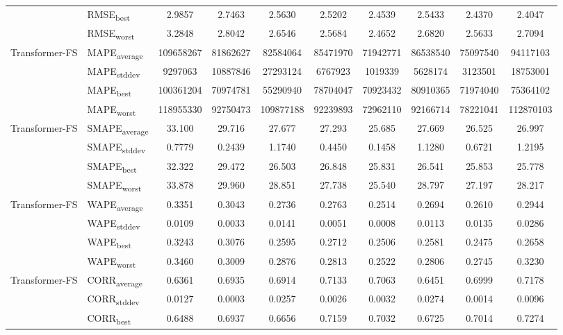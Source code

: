 {\begin{longtable}{l l c c c c c c c c}
 & RMSE\textsubscript{best} & 2.9857 & 2.7463 & 2.5630 & 2.5202 & 2.4539 & 2.5433 & 2.4370 & 2.4047 \\
 & RMSE\textsubscript{worst} & 3.2848 & 2.8042 & 2.6546 & 2.5684 & 2.4652 & 2.6820 & 2.5633 & 2.7094 \\
\cmidrule(lr){2-10}
\multirow{4}{*}{Transformer-FS} & MAPE\textsubscript{average} & 109658267 & 81862627 & 82584064 & 85471970 & 71942771 & 86538540 & 75097540 & 94117103 \\
 & MAPE\textsubscript{stddev} & 9297063 & 10887846 & 27293124 & 6767923 & 1019339 & 5628174 & 3123501 & 18753001 \\
 & MAPE\textsubscript{best} & 100361204 & 70974781 & 55290940 & 78704047 & 70923432 & 80910365 & 71974040 & 75364102 \\
 & MAPE\textsubscript{worst} & 118955330 & 92750473 & 109877188 & 92239893 & 72962110 & 92166714 & 78221041 & 112870103 \\
\cmidrule(lr){2-10}
\multirow{4}{*}{Transformer-FS} & SMAPE\textsubscript{average} & 33.100 & 29.716 & 27.677 & 27.293 & 25.685 & 27.669 & 26.525 & 26.997 \\
 & SMAPE\textsubscript{stddev} & 0.7779 & 0.2439 & 1.1740 & 0.4450 & 0.1458 & 1.1280 & 0.6721 & 1.2195 \\
 & SMAPE\textsubscript{best} & 32.322 & 29.472 & 26.503 & 26.848 & 25.831 & 26.541 & 25.853 & 25.778 \\
 & SMAPE\textsubscript{worst} & 33.878 & 29.960 & 28.851 & 27.738 & 25.540 & 28.797 & 27.197 & 28.217 \\
\cmidrule(lr){2-10}
\multirow{4}{*}{Transformer-FS} & WAPE\textsubscript{average} & 0.3351 & 0.3043 & 0.2736 & 0.2763 & 0.2514 & 0.2694 & 0.2610 & 0.2944 \\
 & WAPE\textsubscript{stddev} & 0.0109 & 0.0033 & 0.0141 & 0.0051 & 0.0008 & 0.0113 & 0.0135 & 0.0286 \\
 & WAPE\textsubscript{best} & 0.3243 & 0.3076 & 0.2595 & 0.2712 & 0.2506 & 0.2581 & 0.2475 & 0.2658 \\
 & WAPE\textsubscript{worst} & 0.3460 & 0.3009 & 0.2876 & 0.2813 & 0.2522 & 0.2806 & 0.2745 & 0.3230 \\
\cmidrule(lr){2-10}
\multirow{4}{*}{Transformer-FS} & CORR\textsubscript{average} & 0.6361 & 0.6935 & 0.6914 & 0.7133 & 0.7063 & 0.6451 & 0.6999 & 0.7178 \\
 & CORR\textsubscript{stddev} & 0.0127 & 0.0003 & 0.0257 & 0.0026 & 0.0032 & 0.0274 & 0.0014 & 0.0096 \\
 & CORR\textsubscript{best} & 0.6488 & 0.6937 & 0.6656 & 0.7159 & 0.7032 & 0.6725 & 0.7014 & 0.7274 \\

\end{longtable}}
